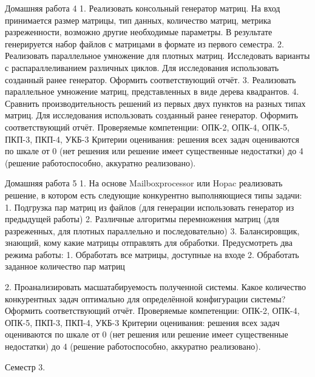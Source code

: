 Домашняя работа 4 
    1. Реализовать консольный генератор матриц. На вход принимается размер матрицы, тип данных, количество матриц, метрика разреженности, возможно другие необходимые параметры. В результате генерируется набор файлов с матрицами в формате из первого семестра. 
    2. Реализовать параллельное умножение для плотных матриц. Исследовать варианты с распараллеливанием различных циклов. Для исследования использовать созданный ранее генератор. Оформить соответствующий отчёт.
    3. Реализовать параллельное умножение матриц, представленных в виде дерева квадрантов.
    4. Сравнить производительность решений из первых двух пунктов на разных типах матриц. Для исследования использовать созданный ранее генератор. Оформить соответствующий отчёт. 
Проверяемые компетенции: ОПК-2, ОПК-4, ОПК-5, ПКП-3, ПКП-4, УКБ-3
Критерии оценивания: решения всех задач оцениваются по шкале от 0 (нет решения или решение имеет существенные недостатки) до 4 (решение работоспособно, аккуратно реализовано).

Домашняя работа 5
    1. На основе Mailboxprocessor или Hopac реализовать решение, в котором есть следующие конкурентно выполняющиеся типы задачи: 
        1. Подгрузка пар матриц из файлов (для генерации использовать генератор из предыдущей работы)
        2. Различные алгоритмы перемножения матриц (для разреженных, для плотных параллельно и последовательно)
        3. Балансировщик, знающий, кому какие матрицы отправлять для обработки.
Предусмотреть два режима работы: 
            1. Обработать все матрицы, доступные на входе
            2. Обработать заданное количество пар матриц
	
    2. Проанализировать масшатабируемость полученной системы. Какое количество конкурентных задач оптимально для определённой конфигурации системы? Оформить соответствующий отчёт.
Проверяемые компетенции: ОПК-2, ОПК-4, ОПК-5, ПКП-3, ПКП-4, УКБ-3
Критерии оценивания: решения всех задач оцениваются по шкале от 0 (нет решения или решение имеет существенные недостатки) до 4 (решение работоспособно, аккуратно реализовано).

Семестр 3.

